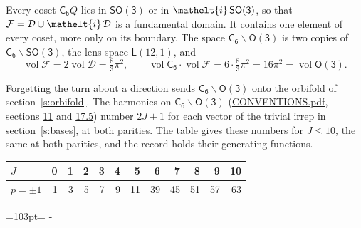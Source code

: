 \documentclass[10pt,a4paper]{article}
\newcommand{\needspace}[1]{\par\penalty-100\begingroup\dimen0=#1\relax\dimen2=\pagegoal
  \advance\dimen2-\pagetotal\ifdim\dimen0>\dimen2\relax\ifdim\dimen2>0pt\vfil\break\fi\fi
  \endgroup}
\numberwithin{equation}{section}
\newcommand{\eltfont}[1]{{\let\sigma\eltsigma\mathelt{#1}}}
\newcommand{\grp}[1]{\mathsf{#1}}
\newcommand{\elt}[1]{\eltfont{#1}}
\newcommand{\vol}{\operatorname{vol}}
\newcommand{\fcell}{\mathcal{D}}
\newcommand{\fdomain}{\mathcal{F}}
\newcommand{\lensspace}[2]{\mathsf{L}(#1, #2)}
\begin{document}
\leavevmode\label{n:set.fundamental}Every coset $\grp{C_{6}}Q$ lies in \href{SO3.pdf}{$\grp{SO(3)}$} or in $\elt{i}\,\grp{SO(3)}$, so that $\fdomain = \fcell \cup \elt{i}\,\fcell$ is a fundamental domain. It contains one element of every coset, more only on its boundary.
\leavevmode\label{n:set.lens}The space $\grp{C_{6}}\backslash\grp{O(3)}$ is two copies of $\grp{C_{6}}\backslash\grp{SO(3)}$, the lens space $\lensspace{12}{1}$, and
\begin{equation}\label{e:volume}\vol\fdomain = 2\vol\fcell = \tfrac{8}{3}\pi^2,\qquad \vol\grp{C_{6}}\cdot\vol\fdomain = 6\cdot \tfrac{8}{3}\pi^2 = 16\pi^2 = \vol\grp{O(3)}.\end{equation}

Forgetting the turn about a direction sends $\grp{C_{6}}\backslash\grp{O(3)}$ onto the orbifold of section~\ref{s:orbifold}.
The harmonics on $\grp{C_{6}}\backslash\grp{O(3)}$ (\href{../../CONVENTIONS.pdf}{CONVENTIONS.pdf}, sections \href{../../CONVENTIONS.pdf\#conv.11}{11} and \href{../../CONVENTIONS.pdf\#conv.17.5}{17.5}) number $2J + 1$ for each vector of the trivial irrep in section~\ref{s:bases}, at both parities. The table gives these numbers for $J \le 10$, the same at both parities, and the record holds their generating functions.
{\small\setlength{\tabcolsep}{4pt}\begin{longtable}{@{}lrrrrrrrrrrr@{}}\toprule
$J$ & 0 & 1 & 2 & 3 & 4 & 5 & 6 & 7 & 8 & 9 & 10\\\midrule\endhead
\bottomrule\endfoot\endlastfoot
$p = \pm 1$ & 1 & 3 & 5 & 7 & 9 & 11 & 39 & 45 & 51 & 57 & 63\\
\bottomrule\end{longtable}}
\needspace{103pt}
\end{document}

